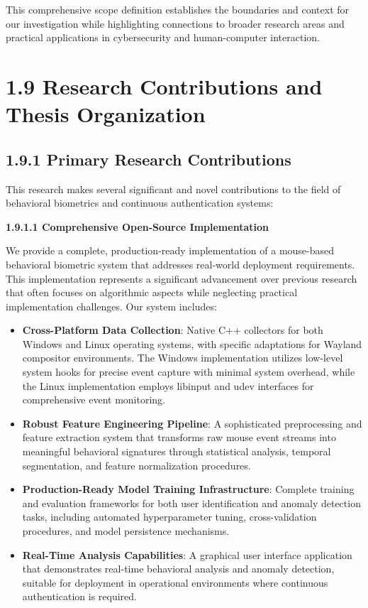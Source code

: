 \documentclass[
  12pt,
  a4paper,
]{report}
\begin{document}
This comprehensive scope definition establishes the boundaries and
context for our investigation while highlighting connections to broader
research areas and practical applications in cybersecurity and
human-computer interaction.

\section{1.9 Research Contributions and Thesis
Organization}\label{research-contributions-and-thesis-organization}

\subsection{1.9.1 Primary Research
Contributions}\label{primary-research-contributions}

This research makes several significant and novel contributions to the
field of behavioral biometrics and continuous authentication systems:

\textbf{1.9.1.1 Comprehensive Open-Source Implementation}

We provide a complete, production-ready implementation of a mouse-based
behavioral biometric system that addresses real-world deployment
requirements. This implementation represents a significant advancement
over previous research that often focuses on algorithmic aspects while
neglecting practical implementation challenges. Our system includes:

\begin{itemize}
\item
  \textbf{Cross-Platform Data Collection}: Native C++ collectors for
  both Windows and Linux operating systems, with specific adaptations
  for Wayland compositor environments. The Windows implementation
  utilizes low-level system hooks for precise event capture with minimal
  system overhead, while the Linux implementation employs libinput and
  udev interfaces for comprehensive event monitoring.
\item
  \textbf{Robust Feature Engineering Pipeline}: A sophisticated
  preprocessing and feature extraction system that transforms raw mouse
  event streams into meaningful behavioral signatures through
  statistical analysis, temporal segmentation, and feature normalization
  procedures.
\item
  \textbf{Production-Ready Model Training Infrastructure}: Complete
  training and evaluation frameworks for both user identification and
  anomaly detection tasks, including automated hyperparameter tuning,
  cross-validation procedures, and model persistence mechanisms.
\item
  \textbf{Real-Time Analysis Capabilities}: A graphical user interface
  application that demonstrates real-time behavioral analysis and
  anomaly detection, suitable for deployment in operational environments
  where continuous authentication is required.
\end{itemize}
\end{document}
